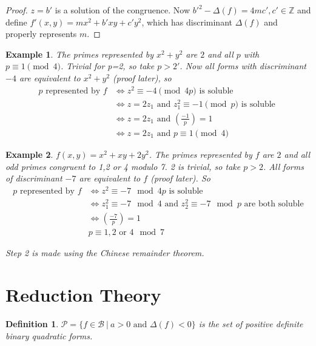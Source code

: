 \documentclass{notes}
\theoremstyle{plain}
\newtheorem{definition}[theorem]{Definition}
\newtheorem*{example}{Example}
\newcommand{\legsym}[2]{\left( \frac{#1}{#2} \right)}
\begin{document}
\begin{proof}
  $z=b'$ is a solution of the congruence.  Now ${b'}^2-\Delta(f)=4mc',
  c' \in \mathbb{Z}$ and define $f'(x,y) = mx^2+b'xy+c'y^2$, which has
  discriminant $\Delta(f)$ and properly represents $m$.
\end{proof}

\begin{example}
  The primes represented by $x^2+y^2$ are $2$ and all $p$ with $p
  \equiv 1 \pmod{4}$.  Trivial for p=2, so take $p>2'$.  Now all forms
  with discriminant $-4$ are equivalent to $x^2+y^2$ (proof later), so
\begin{align*}
  p \text{ represented by } f & \Leftrightarrow z^2 \equiv -4 \pmod{4p} \text{ is soluble } \\
  & \Leftrightarrow z=2z_1 \text{ and } z_1^2 \equiv -1 \pmod{p} \text{ is soluble }\\
  & \Leftrightarrow z=2z_1 \text{ and } \legsym{-1}{p} = 1 \\
  & \Leftrightarrow z=2z_1 \text{ and } p \equiv 1 \pmod{4}
\end{align*}
\end{example}

\begin{example}
  $f(x,y) = x^2+xy+2y^2$. The primes represented by $f$ are $2$ and
  all odd primes congruent to 1,2 or 4 modulo 7.  2 is trivial, so
  take $p>2$.  All forms of discriminant $-7$ are equivalent to $f$
  (proof later).  So
\begin{align*}
  p \text{ represented by } f & \Leftrightarrow z^2 \equiv -7 \mod{4 p} \text{ is soluble} \\
  & \Leftrightarrow z_1^2 \equiv -7 \mod{4} \text{ and } z_2^2 \equiv
  -7 \mod{p}
  \text{ are both soluble} \\
  & \Leftrightarrow \legsym{-7}{p} = 1 \\
  & p \equiv 1,2 \text{ or } 4 \mod{7}
\end{align*}

Step 2 is made using the Chinese remainder theorem.
\end{example}

\section{Reduction Theory}

\begin{definition}
  $\mathcal{P} = \{ f \in \mathcal{B} \: | \: a>0 \text{ and }
  \Delta(f) < 0\}$ is the set of positive definite binary quadratic
  forms.
\end{definition}
\end{document}
